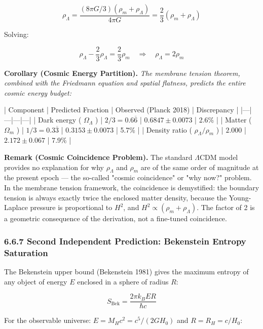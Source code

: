 \documentclass[11pt,a4paper]{article}
\theoremstyle{definition}
\theoremstyle{remark}
\begin{document}
\begin{equation}
\rho_\Lambda = \frac{(8\pi G/3)(\rho_m + \rho_\Lambda)}{4\pi G} = \frac{2}{3}(\rho_m + \rho_\Lambda)
\end{equation}


Solving:


\begin{equation}
\rho_\Lambda - \frac{2}{3}\rho_\Lambda = \frac{2}{3}\rho_m \quad \Longrightarrow \quad \boxed{\rho_\Lambda = 2 \rho_m}
\end{equation}


\textbf{Corollary (Cosmic Energy Partition).} \textit{The membrane tension theorem, combined with the Friedmann equation and spatial flatness, predicts the entire cosmic energy budget:}

| Component | Predicted Fraction | Observed (Planck 2018) | Discrepancy |
|---|---|---|---|
| Dark energy ( $\Omega_\Lambda$ ) | $2/3 = 0.6\overline{6}$ | $0.6847 \pm 0.0073$ | 2.6\% |
| Matter ( $\Omega_m$ ) | $1/3 = 0.3\overline{3}$ | $0.3153 \pm 0.0073$ | 5.7\% |
| Density ratio ( $\rho_\Lambda / \rho_m$ ) | $2.000$ | $2.172 \pm 0.067$ | 7.9\% |

\textbf{Remark (Cosmic Coincidence Problem).} The standard $\Lambda$CDM model provides no explanation for why $\rho_\Lambda$ and $\rho_m$ are of the same order of magnitude at the present epoch — the so-called "cosmic coincidence" or "why now?" problem. In the membrane tension framework, the coincidence is demystified: the boundary tension is always exactly twice the enclosed matter density, because the Young-Laplace pressure is proportional to $H^2$, and $H^2 \propto (\rho_m + \rho_\Lambda)$. The factor of 2 is a geometric consequence of the derivation, not a fine-tuned coincidence.

\subsubsection{6.6.7 Second Independent Prediction: Bekenstein Entropy Saturation}

The Bekenstein upper bound (Bekenstein 1981) gives the maximum entropy of any object of energy $E$ enclosed in a sphere of radius $R$:


\begin{equation}
S_{\text{Bek}} = \frac{2\pi k_B E R}{\hbar c}
\end{equation}


For the observable universe: $E = M_H c^2 = c^5/(2GH_0)$ and $R = R_H = c/H_0$:
\end{document}
